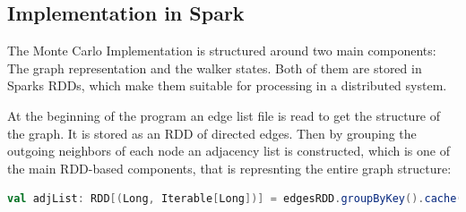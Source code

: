 \subsection{Implementation in Spark}

The Monte Carlo Implementation is structured around two main components: The graph representation and the walker states. Both of them are stored in Sparks RDDs, which make them suitable for processing in a distributed system.\par

At the beginning of the program an edge list file is read to get the structure of the graph. It is stored as an RDD of directed edges. Then by grouping the outgoing neighbors of each node an adjacency list is constructed, which is one of the main RDD-based components, that is represnting the entire graph structure:

\vspace{0.5em}
\begin{lstlisting}[language=Scala, caption={Adjacency list creation}, label={lst:adjlist}]
val adjList: RDD[(Long, Iterable[Long])] = edgesRDD.groupByKey().cache()
\end{lstlisting}
\vspace{0.5em}

